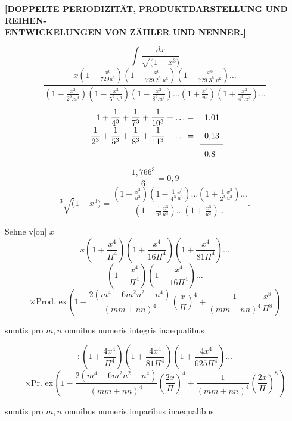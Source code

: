 \begingroup
\setlength{\headheight}{25pt}
\NoSourceHead
{}
\begin{center}\bfseries [DOPPELTE PERIODIZITÄT, PRODUKTDARSTELLUNG UND REIHEN-\\ENTWICKELUNGEN VON ZÄHLER UND NENNER.]\end{center}
\noindent{\small [S. 39]}
\[\int\frac{dx}{\surd(1-x^3)}\]
{\small\[
\frac{x\left(1-\frac{x^6}{729u^6}\right)\left(1-\frac{x^6}{729.2^6.u^6}\right)\left(1-\frac{x^6}{729.3^6.u^6}\right)\ldots}
{\left(1-\frac{x^3}{2^3.u^3}\right)\left(1-\frac{x^3}{5^3.u^3}\right)\left(1-\frac{x^3}{8^3.u^3}\right)\ldots\left(1+\frac{x^3}{u^3}\right)\left(1+\frac{x^3}{4^3.u^3}\right)\ldots}
\]}
\[\renewcommand{\arraystretch}{1.8}\begin{array}{rl}
1+\dfrac1{4^3}+\dfrac1{7^3}+\dfrac1{10^3}+\ldots={}&1{,}01\\
\dfrac1{2^3}+\dfrac1{5^3}+\dfrac1{8^3}+\dfrac1{11^3}+\ldots={}&0{,}13\\\cline{2-2}
&0{,}8
\end{array}\]
\[\frac{1{,}766^3}{6}=0{,}9\]
\[{}^3\!\surd(1-x^3)=
\frac{\left(1-\frac{x^3}{u^3}\right)\left(1-\frac1{4^3}\frac{x^3}{u^3}\right)\ldots\left(1+\frac1{2^3}\frac{x^3}{u^3}\right)\ldots}
{\left(1-\frac1{2^3}\frac{x^3}{u^3}\right)\ldots\left(1+\frac{x^3}{u^3}\right)\ldots}.
\]
\clearpage
{}\fancyhead{}
\noindent{\small [S. 62]}
\par\indent Sehne v[on] \(x=\)
\[x\left(1+\frac{x^4}{\Pi^4}\right)\left(1+\frac{x^4}{16\Pi^4}\right)\left(1+\frac{x^4}{81\Pi^4}\right)\ldots\]
\[\left(1-\frac{x^4}{\Pi^4}\right)\left(1-\frac{x^4}{16\Pi^4}\right)\ldots\]
{\small\[\times\text{Prod. ex}\left(1-\frac{2(m^4-6m^2n^2+n^4)}{(mm+nn)^4}\left(\frac{x}{\Pi}\right)^4+\frac1{(mm+nn)^4}\frac{x^8}{\Pi^8}\right)\]}
\begin{center}sumtis pro \(m,n\) omnibus numeris integris inaequalibus\end{center}
\[{}:\left(1+\frac{4x^4}{\Pi^4}\right)\left(1+\frac{4x^4}{81\Pi^4}\right)\left(1+\frac{4x^4}{625\Pi^4}\right)\ldots\]
{\small\[\times\text{Pr. ex}\left(1-\frac{2(m^4-6m^2n^2+n^4)}{(mm+nn)^4}\left(\frac{2x}{\Pi}\right)^4+\frac1{(mm+nn)^4}\left(\frac{2x}{\Pi}\right)^8\right)\]}
\begin{center}sumtis pro \(m,n\) omnibus numeris imparibus inaequalibus\end{center}
